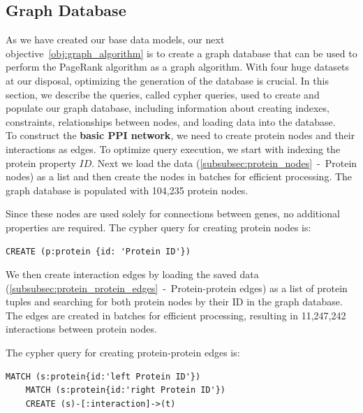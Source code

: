 \subsection{Graph Database} \label{subsec:graph_database}

As we have created our base data models, our next objective~\ref{obj:graph_algorithm} is to create a graph database
that can be used to perform the PageRank algorithm as a graph algorithm.
With four huge datasets at our disposal, optimizing the generation of the database is crucial.
In this section, we describe the queries, called cypher queries, used to create and populate our graph database,
including information about creating indexes, constraints, relationships between nodes, and loading data into the database.\\


To construct the \textbf{basic PPI network}, we need to create protein nodes and their interactions as edges.
To optimize query execution, we start with indexing the protein property $ID$.
Next we load the data (\ref{subsubsec:protein_nodes}~-~Protein nodes) as a list and then create the nodes in batches for efficient processing.
The graph database is populated with 104,235 protein nodes.

Since these nodes are used solely for connections between genes, no additional properties are required.
The cypher query for creating protein nodes is:

\begin{lstlisting}[language=Cypher, label={lst:protein_nodes}]
    CREATE (p:protein {id: 'Protein ID'})
\end{lstlisting}


We then create interaction edges by loading the saved data (\ref{subsubsec:protein_protein_edges}~-~Protein-protein edges)
as a list of protein tuples and searching for both protein nodes by their ID in the graph database.
The edges are created in batches for efficient processing, resulting in 11,247,242 interactions between protein nodes.

The cypher query for creating protein-protein edges is:

\begin{lstlisting}[language=Cypher, label={lst:protein_edges}]
    MATCH (s:protein{id:'left Protein ID'})
    MATCH (s:protein{id:'right Protein ID'})
    CREATE (s)-[:interaction]->(t)
\end{lstlisting}

